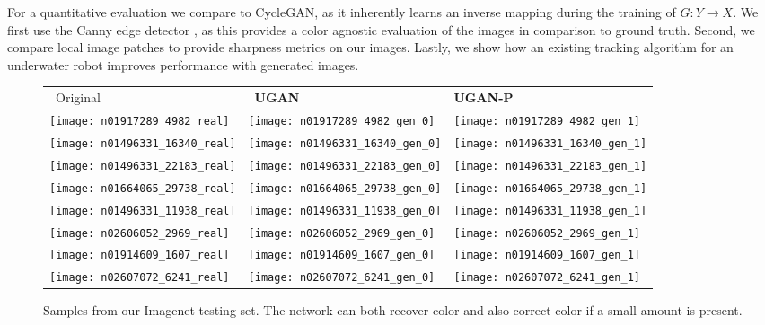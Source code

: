 For a quantitative evaluation we compare to CycleGAN, as it inherently learns an inverse mapping during the training of
$G: Y \rightarrow X$. We first use the Canny edge detector
\cite{canny1986computational}, as this provides a color agnostic evaluation of the images in comparison to ground truth.
Second, we compare local image patches to provide sharpness metrics on our images. Lastly, we show how an existing
tracking algorithm for an underwater robot improves performance with generated images.

\begin{figure}
\centering
\begin{tabular}{p{1.7cm} p{1.7cm} p{1.7cm}}

   ~\quad Original & ~\quad \textbf{UGAN} & \quad \textbf{UGAN-P} \\

   \texttt{[image: n01917289\_4982\_real]} &
   \texttt{[image: n01917289\_4982\_gen\_0]} &
   \texttt{[image: n01917289\_4982\_gen\_1]} \\

   \texttt{[image: n01496331\_16340\_real]} &
   \texttt{[image: n01496331\_16340\_gen\_0]} &
   \texttt{[image: n01496331\_16340\_gen\_1]} \\
   
   \texttt{[image: n01496331\_22183\_real]} &
   \texttt{[image: n01496331\_22183\_gen\_0]} &
   \texttt{[image: n01496331\_22183\_gen\_1]} \\
   
   \texttt{[image: n01664065\_29738\_real]} &
   \texttt{[image: n01664065\_29738\_gen\_0]} &
   \texttt{[image: n01664065\_29738\_gen\_1]} \\
   
   \texttt{[image: n01496331\_11938\_real]} &
   \texttt{[image: n01496331\_11938\_gen\_0]} &
   \texttt{[image: n01496331\_11938\_gen\_1]} \\
   
   \texttt{[image: n02606052\_2969\_real]} &
   \texttt{[image: n02606052\_2969\_gen\_0]} &
   \texttt{[image: n02606052\_2969\_gen\_1]} \\
   
   \texttt{[image: n01914609\_1607\_real]} &
   \texttt{[image: n01914609\_1607\_gen\_0]} &
   \texttt{[image: n01914609\_1607\_gen\_1]} \\

   \texttt{[image: n02607072\_6241\_real]} &
   \texttt{[image: n02607072\_6241\_gen\_0]} &
   \texttt{[image: n02607072\_6241\_gen\_1]} \\

\end{tabular}
\caption{Samples from our Imagenet testing set. The network can both recover color and also correct color if a small amount is 
present.}
\label{fig:test_samples}
\end{figure}


